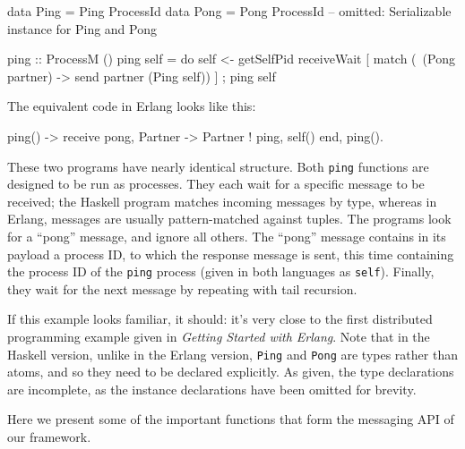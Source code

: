 \documentclass[preprint]{sigplanconf}
\begin{document}
\begin{code}[caption={Ping in Haskell}]
data Ping = Ping ProcessId
data Pong = Pong ProcessId
-- omitted: Serializable instance for Ping and Pong

ping :: ProcessM ()
ping self = 
   do { self <- getSelfPid
        receiveWait [
          match (\ (Pong partner) -> 
            send partner (Ping self)) ]
      ; ping self }
\end{code}

The equivalent code in Erlang looks like this:

\begin{code}[language=Erlang,caption={Ping in Erlang}]
ping() ->
  receive
    {pong, Partner} -> 
      Partner ! {ping, self()}
  end,
  ping().               
\end{code}

These two programs have nearly identical structure. Both \texttt{ping} functions are designed to be run as processes. They each wait for a specific message to be received; the Haskell program matches incoming messages by type, whereas in Erlang, messages are usually pattern-matched against tuples. The programs look for a ``pong'' message, and ignore all others. The ``pong'' message contains in its payload a process ID, to which the response message is sent, this time containing the process ID of the \texttt{ping} process (given in both languages as \texttt{self}). Finally, they wait for the next message by repeating with tail recursion.

If this example looks familiar, it should: it's very close to the first distributed programming example given in {\em Getting Started with Erlang}. Note that in the Haskell version, unlike in the Erlang version, \texttt{Ping} and \texttt{Pong} are types rather than atoms, and so they need to be declared explicitly. As given, the type declarations are incomplete, as the instance declarations have been omitted for brevity.

Here we present some of the important functions that form the messaging API of our framework.
\end{document}
